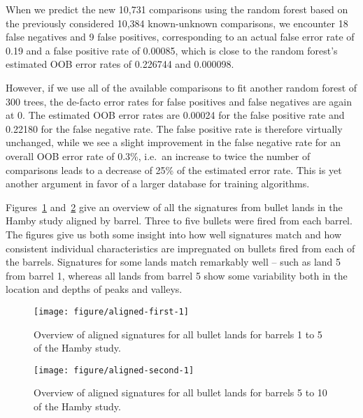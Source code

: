 \documentclass[aoas]{imsart}\usepackage[]{graphicx}\usepackage[]{color}
\newenvironment{knitrout}{}{} %
\newcommand{\hh}[1]{{\color{magenta} #1}}
\begin{document}
When we predict the new 10,731 comparisons using the random forest based on the previously considered 10,384 known-unknown comparisons, we encounter 18 false negatives and 9 false positives, corresponding to an actual false error rate of 0.19 and a false positive rate of 0.00085, which is close to the random forest's estimated OOB error rates of 0.226744 and 0.000098. 

However, if we use all of the available comparisons to fit another random forest of 300 trees, the de-facto error rates for false positives and false negatives are again at 0. The estimated OOB error rates are 0.00024 for the false positive rate and 0.22180 for the false negative rate. The false positive rate is therefore virtually unchanged, while we see a slight improvement in the false negative rate for an overall OOB error rate of 0.3\%, i.e.\ an increase to twice the number of comparisons leads to a decrease of 25\% of the estimated error rate. This is yet another argument in favor of a larger database for training algorithms.






Figures~\ref{fig:aligned} and~\ref{fig:aligned-second} give an overview of all the signatures from bullet lands in the Hamby study aligned by barrel. Three to five bullets were fired from each barrel. The figures give us both some insight into how well signatures match and how consistent individual characteristics are impregnated on bullets fired from each of the barrels. Signatures for some lands match remarkably well -- such as land 5 from barrel 1, whereas all lands from barrel 5 show some variability both in the location and depths of peaks and valleys.



\begin{landscape}
\begin{figure}[hbtp]
\begin{knitrout}
\color{fgcolor}
\texttt{[image: figure/aligned-first-1]} 

\end{knitrout}
\caption{\label{fig:aligned}Overview of aligned signatures for all bullet lands for  barrels 1 to 5 of the Hamby study. }
\end{figure}

\begin{figure}[hbtp]
\begin{knitrout}
\color{fgcolor}
\texttt{[image: figure/aligned-second-1]} 

\end{knitrout}
\caption{\label{fig:aligned-second}Overview of aligned signatures for all bullet lands for  barrels 5 to 10 of the Hamby study. }
\end{figure}
\end{landscape}
\newpage
\end{document}
